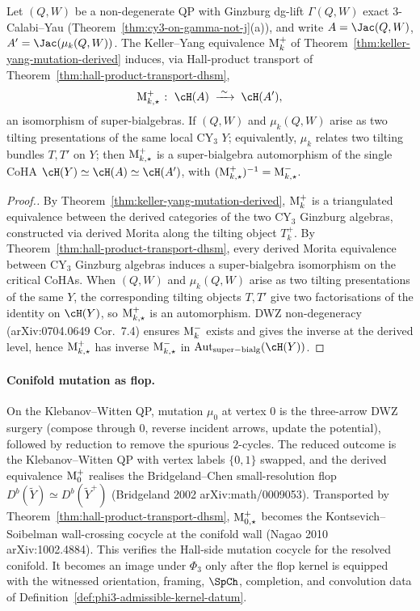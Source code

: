 \begin{theorem}
\label{thm:mutation-coha-automorphism-dhsm}
Let $(Q, W)$ be a non-degenerate QP with Ginzburg dg-lift $\Gamma(Q, W)$ exact $3$-Calabi--Yau (Theorem~\ref{thm:cy3-on-gamma-not-j}(a)), and write $A = \Jac(Q, W)$, $A' = \Jac(\mu_k(Q, W))$. The Keller--Yang equivalence $\mathrm{M}_k^{+}$ of Theorem~\ref{thm:keller-yang-mutation-derived} induces, via Hall-product transport of Theorem~\ref{thm:hall-product-transport-dhsm},
\[
 \Mu_{k, \star}^{+} \;\colon\; \cH(A) \;\xrightarrow{\;\sim\;}\; \cH(A'),
\]
an isomorphism of super-bialgebras. If $(Q, W)$ and $\mu_k(Q, W)$ arise as two tilting presentations of the same local CY$_3$ $Y$; equivalently, $\mu_k$ relates two tilting bundles $T, T'$ on $Y$; then $\mathrm{M}_{k, \star}^{+}$ is a super-bialgebra automorphism of the single CoHA $\cH(Y) \simeq \cH(A) \simeq \cH(A')$, with $(\mathrm{M}_{k, \star}^{+})^{-1} = \mathrm{M}_{k, \star}^{-}$.
\end{theorem}

\begin{proof}[Proof.]
By Theorem~\ref{thm:keller-yang-mutation-derived}, $\mathrm{M}_k^{+}$ is a triangulated equivalence between the derived categories of the two CY$_3$ Ginzburg algebras, constructed via derived Morita along the tilting object $T_k^{+}$. By Theorem~\ref{thm:hall-product-transport-dhsm}, every derived Morita equivalence between CY$_3$ Ginzburg algebras induces a super-bialgebra isomorphism on the critical CoHAs. When $(Q, W)$ and $\mu_k(Q, W)$ arise as two tilting presentations of the same $Y$, the corresponding tilting objects $T, T'$ give two factorisations of the identity on $\cH(Y)$, so $\mathrm{M}_{k, \star}^{+}$ is an automorphism. DWZ non-degeneracy (arXiv:0704.0649 Cor.~7.4) ensures $\mathrm{M}_k^{-}$ exists and gives the inverse at the derived level, hence $\mathrm{M}_{k, \star}^{+}$ has inverse $\mathrm{M}_{k, \star}^{-}$ in $\mathrm{Aut}_{\mathrm{super{-}bialg}}(\cH(Y))$.
\end{proof}

\paragraph{Conifold mutation as flop.} On the Klebanov--Witten QP, mutation $\mu_0$ at vertex $0$ is the three-arrow DWZ surgery (compose through $0$, reverse incident arrows, update the potential), followed by reduction to remove the spurious $2$-cycles. The reduced outcome is the Klebanov--Witten QP with vertex labels $\{0, 1\}$ swapped, and the derived equivalence $\mathrm{M}_0^{+}$ realises the Bridgeland--Chen small-resolution flop $D^{b}(\tilde Y) \simeq D^{b}(\tilde Y^{+})$ (Bridgeland 2002 arXiv:math/0009053). Transported by Theorem~\ref{thm:hall-product-transport-dhsm}, $\mathrm{M}_{0, \star}^{+}$ becomes the Kontsevich--Soibelman wall-crossing cocycle at the conifold wall (Nagao 2010 arXiv:1002.4884). This verifies the Hall-side mutation cocycle for the resolved conifold. It becomes an image under $\Phi_3$ only after the flop kernel is equipped with the witnessed orientation, framing, $\SpCh$, completion, and convolution data of Definition~\ref{def:phi3-admissible-kernel-datum}.

